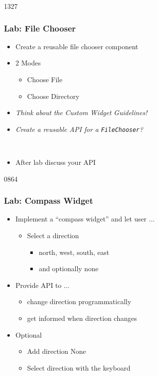 \begin{slide}{1327}\frametitle{Lab: File Chooser}
 \begin{itemize}
  \item Create a reusable file chooser component
  \item 2 Modes
    \begin{itemize}
    \item Choose File
    \item Choose Directory
    \end{itemize}
  \item \textit{Think about the Custom Widget Guidelines!}
  \item \textit{Create a reusable API for a
      \texttt{FileChooser}?}
 \end{itemize}
  \\
 \begin{itemize}
 \item After lab discuss your API
 \end{itemize}
\end{slide}

\begin{slide}{0864}\frametitle{Lab: Compass Widget}
  \label{writing_your_own_widget_exercize}
  \begin{itemize}
  \item Implement a ``compass widget'' and let user ...
    \begin{itemize}
    \item Select a direction
      \begin{itemize}
      \item north, west, south, east
      \item and optionally none
      \end{itemize}
    \end{itemize}
    \item Provide API to ...
      \begin{itemize}
      \item change direction programmatically
      \item get informed when direction changes
      \end{itemize}
    \item Optional      
    \begin{itemize}
      \item Add direction None
      \item Select direction with the keyboard
    \end{itemize}
  \end{itemize}
\end{slide}

